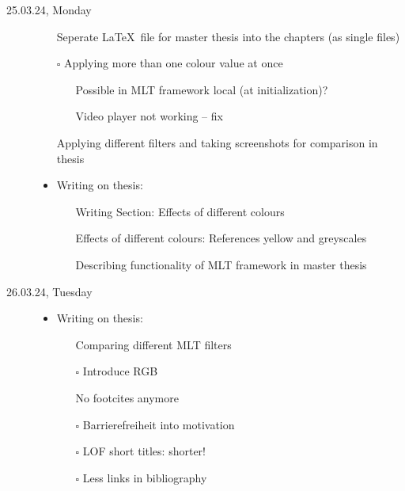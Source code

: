 \documentclass[a4, 11pt]{scrartcl}
\newcommand{\cmark}{\ding{51}}%
\newcommand{\done}{\rlap{$\square$}{\raisebox{2pt}{\large\hspace{1pt}\cmark}}%
	\hspace{-2.5pt}}
\begin{document}
\begin{description}
	
	
	
	\item[25.03.24, Monday]
	\begin{itemize}
		\item[]

		\item[\done] Seperate \LaTeX \ file for master thesis into the chapters (as single files)
			
		\item[$\square$] Applying more than one colour value at once
			
		\begin{itemize}
			\item[\done] Possible in MLT framework local (at initialization)?
			\item[\done] Video player not working -- fix
		\end{itemize}	
	
		\item[\done] Applying different filters and taking screenshots for comparison in thesis
		
		
		\item Writing on thesis:
		\begin{itemize}
			\item[\done] Writing Section: Effects of different colours
			\item[\done] Effects of different colours: References yellow and greyscales
			\item[\done] Describing functionality of MLT framework in master thesis
		\end{itemize}
		
		
	\end{itemize}	
	
	
	
	
	
	
\item[26.03.24, Tuesday]
\begin{itemize}
	\item[]
	
	\item Writing on thesis:
	\begin{itemize}
		\item[\done] Comparing different MLT filters 
		\item[$\square$] Introduce RGB
		\item[\done] No footcites anymore
		\item[$\square$] Barrierefreiheit into motivation
		\item[$\square$] LOF short titles: shorter!
		\item[$\square$] Less links in bibliography
	\end{itemize}
	

\end{itemize}
\end{description}
\end{document}
